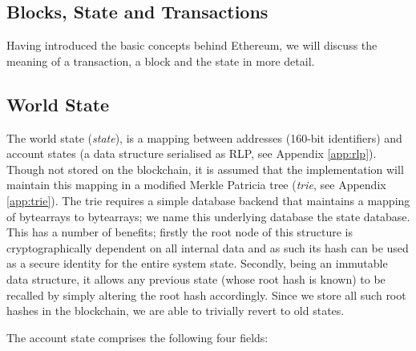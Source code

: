 \documentclass[9pt,oneside]{amsart}
\begin{document}
\begin{multicols}{2}
\section{Blocks, State and Transactions} \label{ch:bst}

Having introduced the basic concepts behind Ethereum, we will discuss the meaning of a transaction, a block and the state in more detail.

\subsection{World State} \label{ch:state}

The world state (\textit{state}), is a mapping between addresses (160-bit identifiers) and account states (a data structure serialised as RLP, see Appendix \ref{app:rlp}). Though not stored on the blockchain, it is assumed that the implementation will maintain this mapping in a modified Merkle Patricia tree (\textit{trie}, see Appendix \ref{app:trie}). The trie requires a simple database backend that maintains a mapping of bytearrays to bytearrays; we name this underlying database the state database. This has a number of benefits; firstly the root node of this structure is cryptographically dependent on all internal data and as such its hash can be used as a secure identity for the entire system state. Secondly, being an immutable data structure, it allows any previous state (whose root hash is known) to be recalled by simply altering the root hash accordingly. Since we store all such root hashes in the blockchain, we are able to trivially revert to old states.

The account state comprises the following four fields:


\end{multicols}
\end{document}
